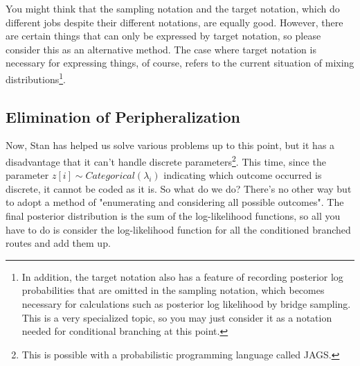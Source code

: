 \documentclass{ltjsbook}
\begin{document}
	You might think that the sampling notation and the target notation, which do different jobs despite their different notations, are equally good. However, there are certain things that can only be expressed by target notation, so please consider this as an alternative method. The case where target notation is necessary for expressing things, of course, refers to the current situation of mixing distributions\footnote{In addition, the target notation also has a feature of recording posterior log probabilities that are omitted in the sampling notation, which becomes necessary for calculations such as posterior log likelihood by bridge sampling. This is a very specialized topic, so you may just consider it as a notation needed for conditional branching at this point.}.
	\subsection{Elimination of Peripheralization}
	Now, Stan has helped us solve various problems up to this point, but it has a disadvantage that it can't handle discrete parameters\footnote{This is possible with a probabilistic programming language called JAGS.}.
	This time, since the parameter $z[i] \sim Categorical(\lambda_{i})$ indicating which outcome occurred is discrete, it cannot be coded as it is. So what do we do? There's no other way but to adopt a method of "enumerating and considering all possible outcomes".
	The final posterior distribution is the sum of the log-likelihood functions, so all you have to do is consider the log-likelihood function for all the conditioned branched routes and add them up.
\end{document}
